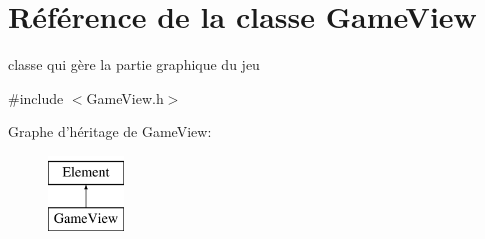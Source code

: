 \hypertarget{classGameView}{
\section{Référence de la classe GameView}
\label{classGameView}
}


classe qui gère la partie graphique du jeu  




{\ttfamily \#include $<$GameView.h$>$}

Graphe d'héritage de GameView:\begin{figure}[H]
\begin{center}
\leavevmode
\includegraphics[height=2.000000cm]{classGameView}
\end{center}
\end{figure}
